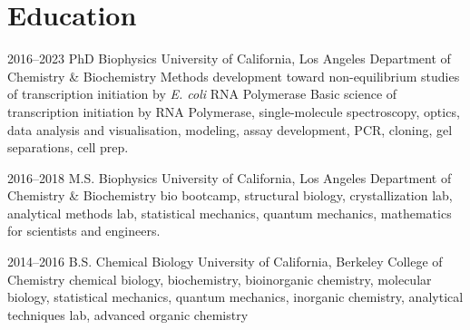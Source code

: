 \section{Education}

\begin{entrylist}
\courseentry
{2016--2023}
{PhD {\normalfont Biophysics}}
{University of California, Los Angeles}
{Department of Chemistry \& Biochemistry}
{Methods development toward non-equilibrium studies of transcription
initiation by \textit{E. coli} RNA Polymerase}
 {Basic science of transcription initiation by RNA Polymerase, single-molecule spectroscopy, optics, data analysis and visualisation, modeling, assay development, PCR, cloning, gel separations, cell prep.}

\courseentry
{2016--2018}
{M.S. {\normalfont Biophysics}}
{University of California, Los Angeles}
{Department of Chemistry \& Biochemistry}
{}
{bio bootcamp, structural biology, crystallization lab, analytical methods lab, statistical mechanics, quantum mechanics, mathematics for scientists and engineers.}

\courseentry
{2014--2016}
{B.S. {\normalfont Chemical Biology}}
{University of California, Berkeley}
{College of Chemistry}
{}
{chemical biology, biochemistry, bioinorganic chemistry, molecular biology, statistical mechanics, quantum mechanics, inorganic chemistry, analytical techniques lab, advanced organic chemistry}
\end{entrylist}

